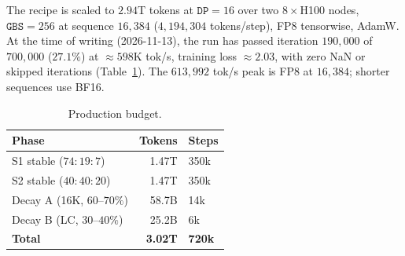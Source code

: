 The recipe is scaled to $2.94$T tokens at $\texttt{DP}{=}16$ over two $8{\times}$H100 nodes, $\texttt{GBS}{=}256$ at sequence $16{,}384$ ($4{,}194{,}304$ tokens/step), FP8 tensorwise, AdamW.
At the time of writing (2026-11-13), the run has passed iteration $190{,}000$ of $700{,}000$ ($27.1\%$) at $\mathbf{\approx}598$K tok/s, training loss $\approx2.03$, with zero NaN or skipped iterations (Table~\ref{tab:prod-budget}). The $613{,}992$ tok/s peak is FP8 at $16{,}384$; shorter sequences use BF16.

\begin{table}[t]
\centering
\caption{Production budget.}
\label{tab:prod-budget}
\footnotesize
\setlength{\tabcolsep}{6pt}
\begin{tabular}{@{}lrl@{}}
\toprule
\textbf{Phase} & \textbf{Tokens} & \textbf{Steps} \\
\midrule
S1 stable ($74{:}19{:}7$) & 1.47T & 350k \\
S2 stable ($40{:}40{:}20$) & 1.47T & 350k \\
Decay A (16K, $60$--$70\%$) & 58.7B & 14k \\
Decay B (LC, $30$--$40\%$) & 25.2B & 6k \\
\midrule
\textbf{Total} & \textbf{3.02T} & \textbf{720k} \\
\bottomrule
\end{tabular}
\end{table}


